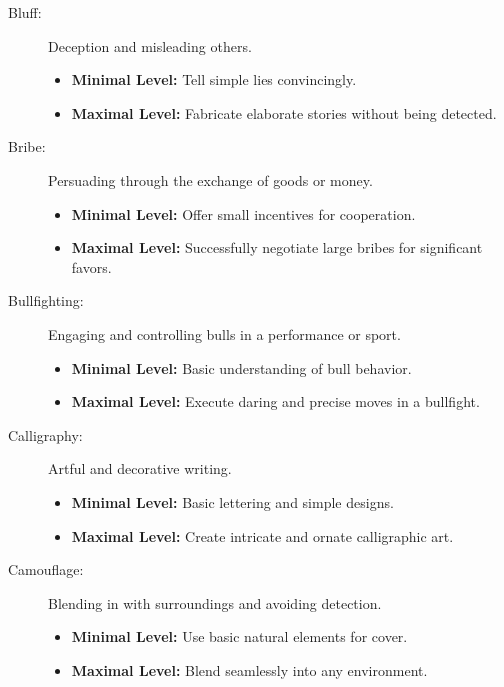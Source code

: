 \documentclass[12pt]{book}  %
\begin{document}
\begin{description}
    \item[Bluff:] Deception and misleading others.
        \begin{itemize}
            \item \textbf{Minimal Level:} Tell simple lies convincingly.
            \item \textbf{Maximal Level:} Fabricate elaborate stories without being detected.
        \end{itemize}

    \item[Bribe:] Persuading through the exchange of goods or money.
        \begin{itemize}
            \item \textbf{Minimal Level:} Offer small incentives for cooperation.
            \item \textbf{Maximal Level:} Successfully negotiate large bribes for significant favors.
        \end{itemize}

    \item[Bullfighting:] Engaging and controlling bulls in a performance or sport.
        \begin{itemize}
            \item \textbf{Minimal Level:} Basic understanding of bull behavior.
            \item \textbf{Maximal Level:} Execute daring and precise moves in a bullfight.
        \end{itemize}

    \item[Calligraphy:] Artful and decorative writing.
        \begin{itemize}
            \item \textbf{Minimal Level:} Basic lettering and simple designs.
            \item \textbf{Maximal Level:} Create intricate and ornate calligraphic art.
        \end{itemize}

    \item[Camouflage:] Blending in with surroundings and avoiding detection.
        \begin{itemize}
            \item \textbf{Minimal Level:} Use basic natural elements for cover.
            \item \textbf{Maximal Level:} Blend seamlessly into any environment.
        \end{itemize}


\end{description}
\end{document}
